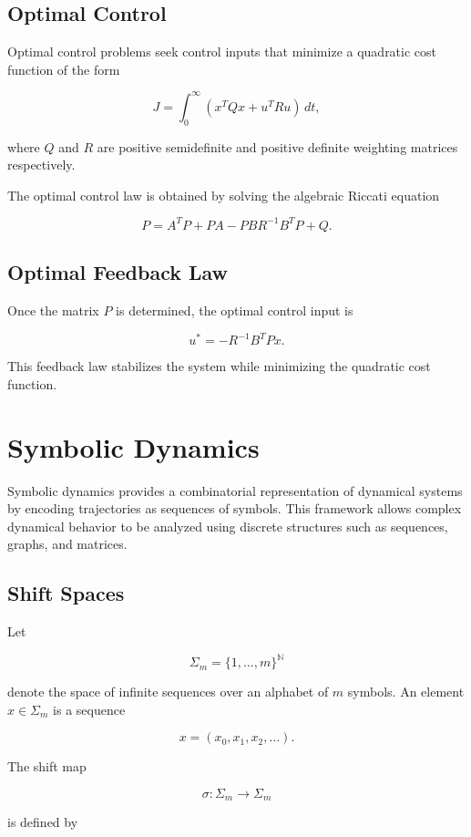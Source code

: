 \documentclass[12pt]{article}
\begin{document}
\subsection{Optimal Control}

Optimal control problems seek control inputs that minimize a quadratic cost function of the form

\[
J = \int_0^\infty (x^T Q x + u^T R u)\,dt,
\]

where $Q$ and $R$ are positive semidefinite and positive definite weighting matrices respectively.

The optimal control law is obtained by solving the algebraic Riccati equation

\[
P = A^TP + PA - PBR^{-1}B^TP + Q.
\]

\subsection{Optimal Feedback Law}

Once the matrix $P$ is determined, the optimal control input is

\[
u^* = -R^{-1}B^TPx.
\]

This feedback law stabilizes the system while minimizing the quadratic cost function.

\section{Symbolic Dynamics}

Symbolic dynamics provides a combinatorial representation of dynamical systems by encoding trajectories as sequences of symbols. This framework allows complex dynamical behavior to be analyzed using discrete structures such as sequences, graphs, and matrices.

\subsection{Shift Spaces}

Let

\[
\Sigma_m = \{1,\dots,m\}^{\mathbb{N}}
\]

denote the space of infinite sequences over an alphabet of $m$ symbols. An element $x \in \Sigma_m$ is a sequence

\[
x=(x_0,x_1,x_2,\dots).
\]

The shift map

\[
\sigma : \Sigma_m \rightarrow \Sigma_m
\]

is defined by
\end{document}
